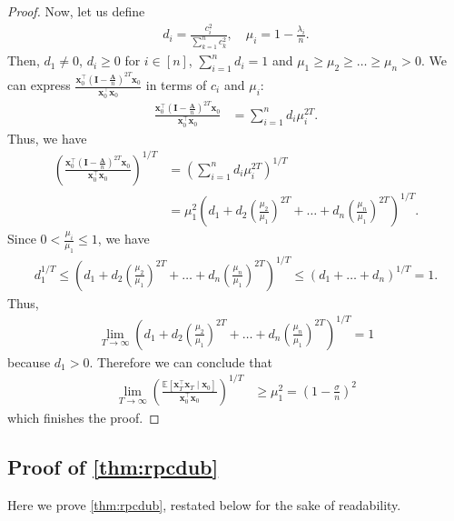 \documentclass{article}
\theoremstyle{plain}
\theoremstyle{definition}
\theoremstyle{remark}
\def\bigopen#1{\left(#1\right)}
\def\bigclosed#1{\left[#1\right]}
\def\vx{{\bm{x}}}
\def\mA{{\bm{A}}}
\def\mI{{\bm{I}}}
\newcommand{\E}{\mathbb{E}}
\begin{document}
\begin{proof}
Now, let us define 
\begin{align*}
    d_i = \frac{c_i^2}{\sum_{k=1}^n c_k^2}, \quad \mu_i = 1-\frac{\lambda_i}{n}.
\end{align*}
Then, $d_1\ne 0$, $d_i\ge 0$ for $i\in [n]$, $\sum_{i=1}^n d_i = 1$ and $\mu_1\ge \mu_2 \ge \dots \ge \mu_n > 0$. We can express $\frac{\vx_0^{\top} \bigopen{\mI - \frac{\mA}{n}}^{2T} \vx_0}{\vx_0^{\top} \vx_0}$ in terms of $c_i$ and $\mu_i$:
\begin{align*}
    \frac{\vx_0^{\top} \bigopen{\mI - \frac{\mA}{n}}^{2T} \vx_0}{\vx_0^{\top} \vx_0} &= \sum_{i=1}^n d_i \mu_i^{2T}.
\end{align*}
Thus, we have 
\begin{align*}
    \bigopen{\frac{\vx_0^{\top} \bigopen{\mI - \frac{\mA}{n}}^{2T} \vx_0}{\vx_0^{\top} \vx_0}}^{1/T} &= \bigopen{\sum_{i=1}^n d_i \mu_i^{2T}}^{1/T} \\
    &= \mu_1^2 \bigopen{d_1 + d_2 \bigopen{\frac{\mu_2}{\mu_1}}^{2T} + \dots + d_n \bigopen{\frac{\mu_n}{\mu_1}}^{2T}}^{1/T}.
\end{align*}
Since $0 < \frac{\mu_i}{\mu_1} \le 1$, we have 
\begin{align*}
    d_1^{1/T} \le \bigopen{d_1 + d_2 \bigopen{\frac{\mu_2}{\mu_1}}^{2T} + \dots + d_n \bigopen{\frac{\mu_n}{\mu_1}}^{2T}}^{1/T} \le \bigopen{d_1 + \dots + d_n}^{1/T} = 1.
\end{align*}
Thus,
\begin{align*}
    \lim_{T \to \infty} \bigopen{d_1 + d_2 \bigopen{\frac{\mu_2}{\mu_1}}^{2T} + \dots + d_n \bigopen{\frac{\mu_n}{\mu_1}}^{2T}}^{1/T} = 1
\end{align*}
because $d_1 > 0$.
Therefore we can conclude that
\begin{align*}
    \lim_{T \to \infty} \bigopen{\frac{\E \bigclosed{\vx_T^{\top} \vx_T\mid \vx_0}}{\vx_0^{\top} \vx_0}}^{1/T} &\ge \mu_1^2 = \bigopen{1-\frac{\sigma}{n}}^2
\end{align*}
which finishes the proof.
\end{proof}


\subsection{Proof of \cref{thm:rpcdub}}
\label{subsec:rpcdub}

Here we prove \cref{thm:rpcdub}, restated below for the sake of readability.

\thmrpcdub*
\end{document}
